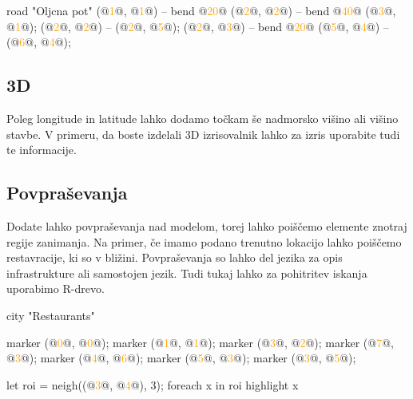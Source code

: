 \documentclass{article}
\newcommand\Num[1]{\textcolor{orange}{#1}}
\begin{document}
\newpage

\begin{CITY}
  road "Oljcna pot" {
    (@\Num{1}@, @\Num{1}@) -- bend @\Num{20}@ (@\Num{2}@, @\Num{2}@) -- bend @\Num{40}@ (@\Num{3}@, @\Num{1}@);
    (@\Num{2}@, @\Num{2}@) -- (@\Num{2}@, @\Num{5}@);
    (@\Num{2}@, @\Num{3}@) -- bend @\Num{20}@ (@\Num{5}@, @\Num{4}@) -- (@\Num{6}@, @\Num{4}@);
  }
\end{CITY}

\subsection{3D}
Poleg longitude in latitude lahko dodamo točkam še nadmorsko višino ali višino stavbe.
V primeru, da boste izdelali 3D izrisovalnik lahko za izris uporabite tudi te informacije.

\subsection{Povpraševanja}
Dodate lahko povpraševanja nad modelom, torej lahko poiščemo elemente znotraj regije zanimanja.
Na primer, če imamo podano trenutno lokacijo lahko poiščemo restavracije, ki so v bližini.
Povpraševanja so lahko del jezika za opis infrastrukture ali samostojen jezik.
Tudi tukaj lahko za pohitritev iskanja uporabimo R-drevo.

\begin{multicols}{2}
\begin{CITY}
  city "Restaurants" {
    marker (@\Num{0}@, @\Num{0}@);
    marker (@\Num{1}@, @\Num{1}@);
    marker (@\Num{3}@, @\Num{2}@);
    marker (@\Num{7}@, @\Num{3}@);
    marker (@\Num{4}@, @\Num{6}@);
    marker (@\Num{5}@, @\Num{3}@);
    marker (@\Num{3}@, @\Num{5}@);

    let roi = neigh((@\Num{3}@, @\Num{4}@), 3);
    foreach x in roi {
      highlight x
    }
  }
\end{CITY}

\columnbreak

\end{multicols}
\end{document}
